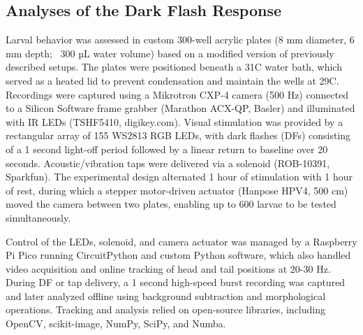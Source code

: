 \documentclass[9.5pt,lineno]{RandlettLab_elife}
\begin{document}
\subsection{Analyses of the Dark Flash Response}
Larval behavior was assessed in custom 300-well acrylic plates (8 mm diameter, 6 mm depth; ~300 µL water volume) based on a modified version of previously described setups.
The plates were positioned beneath a 31\degree C water bath, which served as a heated lid to prevent condensation and maintain the wells at 29\degree C.
Recordings were captured using a Mikrotron CXP-4 camera (500 Hz) connected to a Silicon Software frame grabber (Marathon ACX-QP, Basler) and illuminated with IR LEDs (TSHF5410, digikey.com).
Visual stimulation was provided by a rectangular array of 155 WS2813 RGB LEDs, with dark flashes (DFs) consisting of a 1 second light-off period followed by a linear return to baseline over 20 seconds.
Acoustic/vibration taps were delivered via a solenoid (ROB-10391, Sparkfun).
The experimental design alternated 1 hour of stimulation with 1 hour of rest, during which a stepper motor-driven actuator (Hanpose HPV4, 500 cm) moved the camera between two plates, enabling up to 600 larvae to be tested simultaneously.

Control of the LEDs, solenoid, and camera actuator was managed by a Raspberry Pi Pico running CircuitPython and custom Python software, which also handled video acquisition and online tracking of head and tail positions at 20-30 Hz.
During DF or tap delivery, a 1 second high-speed burst recording was captured and later analyzed offline using background subtraction and morphological operations.
Tracking and analysis relied on open-source libraries, including OpenCV, scikit-image, NumPy, SciPy, and Numba.
\end{document}

